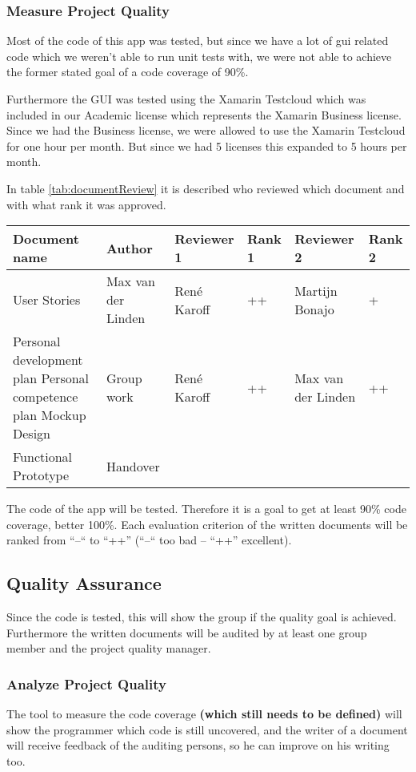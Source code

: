 \subsubsection{Measure Project Quality}
Most of the code of this \gls{app} was tested, but since we have a lot of \gls{gui} related code which we weren't able to run unit tests with, we were not able to achieve the former stated goal of a code coverage of 90\%.

Furthermore the GUI was tested using the Xamarin Testcloud which was included in our Academic license which represents the Xamarin Business license. Since we had the Business license, we were allowed to use the Xamarin Testcloud for one hour per month. But since we had 5 licenses this expanded to 5 hours per month.

In table \ref{tab:documentReview} it is described who reviewed which document and with what rank it was approved.
\begin{sidewaystable}
	\begin{tabular}[htbp]{ p{7cm} *{5}{l} }
		\textbf{Document name} & \textbf{Author} & \textbf{Reviewer 1} & \textbf{Rank 1} & \textbf{Reviewer 2} & \textbf{Rank 2} \\ \hline
		User Stories & Max van der Linden & René Karoff & ++ & Martijn Bonajo & + \\
		Personal development plan
		Personal competence plan
		Mockup Design & Group work & René Karoff & ++ & Max van der Linden & ++ \\
		Functional Prototype & Handover &  &  &  &  \\
	\end{tabular}
\end{sidewaystable}

The code of the \gls{app} will be tested. Therefore it is a goal to get at least 90\% code coverage, better 100\%. Each evaluation criterion of the written documents will be ranked from “--“ to “++” (“--“ too bad – “++” excellent).

\subsection{Quality Assurance}
Since the code is tested, this will show the group if the quality goal is achieved. Furthermore the written documents will be audited by at least one group member and the project quality manager.
\subsubsection{Analyze Project Quality}
The tool to measure the code coverage \textbf{(which still needs to be defined)} will show the programmer which code is still uncovered, and the writer of a document will receive feedback of the auditing persons, so he can improve on his writing too.
